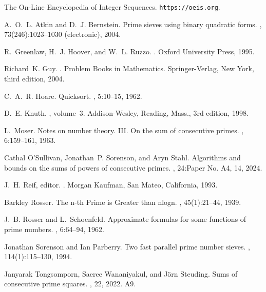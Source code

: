 \documentclass[11pt]{amsart}
\numberwithin{equation}{section}
\numberwithin{algorithm}{section}
\begin{document}
%
\begin{thebibliography}{10}

{The On-Line Encyclopedia of Integer Sequences}.
\newblock \texttt{https://oeis.org}.

A.~O.~L. Atkin and D.~J. Bernstein.
\newblock Prime sieves using binary quadratic forms.
, 73(246):1023--1030 (electronic), 2004.

R.~Greenlaw, H.~J. Hoover, and W.~L. Ruzzo.
.
\newblock Oxford University Press, 1995.

Richard~K. Guy.
.
\newblock Problem Books in Mathematics. Springer-Verlag, New York, third
  edition, 2004.

C.~A.~R. Hoare.
\newblock Quicksort.
, 5:10--15, 1962.

D.~E. Knuth.
,
  volume~3.
\newblock Addison-Wesley, Reading, Mass., 3rd edition, 1998.

L.~Moser.
\newblock Notes on number theory. {III}. {O}n the sum of consecutive primes.
, 6:159--161, 1963.

Cathal O'Sullivan, Jonathan~P. Sorenson, and Aryn Stahl.
\newblock Algorithms and bounds on the sums of powers of consecutive primes.
, 24:Paper No. A4, 14, 2024.

J.~H. Reif, editor.
.
\newblock Morgan Kaufman, San Mateo, California, 1993.

Barkley Rosser.
\newblock The n-th {P}rime is {G}reater than nlogn.
, 45(1):21--44, 1939.

J.~B. Rosser and L.~Schoenfeld.
\newblock Approximate formulas for some functions of prime numbers.
, 6:64--94, 1962.

Jonathan Sorenson and Ian Parberry.
\newblock Two fast parallel prime number sieves.
, 114(1):115--130, 1994.

Janyarak Tongsomporn, Saeree Wananiyakul, and {J\"{o}rn} Steuding.
\newblock Sums of consecutive prime squares.
, 22, 2022.
\newblock A9.

\end{thebibliography}
\end{document}

